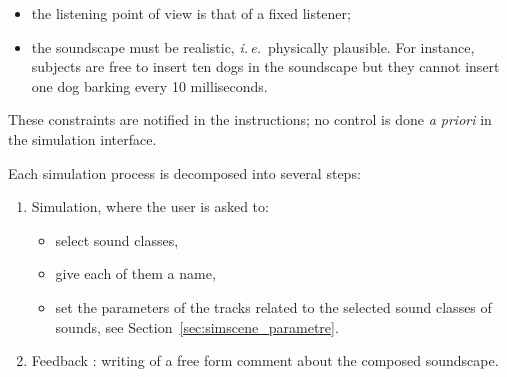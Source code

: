 \documentclass[12pt]{elsarticle}
\newcommand{\ie}{\emph{i.\,e.}}
\newcommand{\cf}{cf.}
\begin{document}
\begin{itemize}
\item the listening point of view is that of a fixed listener;
\item the soundscape must be realistic, \ie~physically plausible. For instance, subjects are free to insert ten dogs in the soundscape but they cannot insert one dog barking every 10 milliseconds.
\end{itemize}


These constraints are notified in the instructions; no control is done \emph{a priori} in the simulation interface.

%

Each simulation process is decomposed into several steps:

\begin{enumerate}
\item Simulation, where the user is asked to:
  \begin{itemize}
  \item  select sound classes,
  \item  give each of them a name,
  \item  set the parameters of the tracks related to the selected sound classes of sounds, see Section~\ref{sec:simscene_parametre}.
  \end{itemize}
\item Feedback : writing of a free form comment about the composed soundscape.
\end{enumerate}

%
\end{document}
